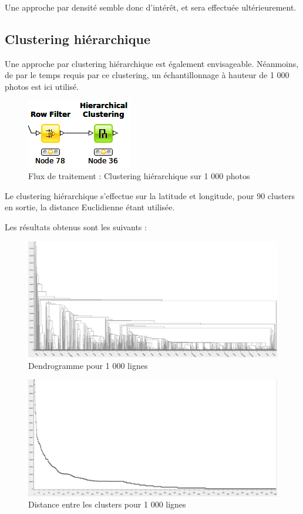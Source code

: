 Une approche par densité semble donc d'intérêt, et sera effectuée ultérieurement.

\pagebreak



\subsection{Clustering hiérarchique}
Une approche par clustering hiérarchique est également envisageable. Néanmoins, de par le temps requis par ce clustering, un échantillonnage à hauteur de 1 000 photos est ici utilisé.

\begin{figure}[H]
    \centering
    \includegraphics[width=0.25\linewidth]{img/knime_hierarchical.png}
    \caption{Flux de traitement : Clustering hiérarchique sur 1 000 photos}
\end{figure}

Le clustering hiérarchique s'effectue sur la latitude et longitude, pour 90 clusters en sortie, la distance Euclidienne étant utilisée.

Les résultats obtenus sont les suivants :
\begin{figure}[H]
    \centering
    \includegraphics[width=\linewidth]{img/1000_histo1.png}
    \caption{Dendrogramme pour 1 000 lignes}
\end{figure}

\begin{figure}[H]
    \centering
    \includegraphics[width=\linewidth]{img/1000_histo2.png}
    \caption{Distance entre les clusters pour 1 000 lignes}
\end{figure}

